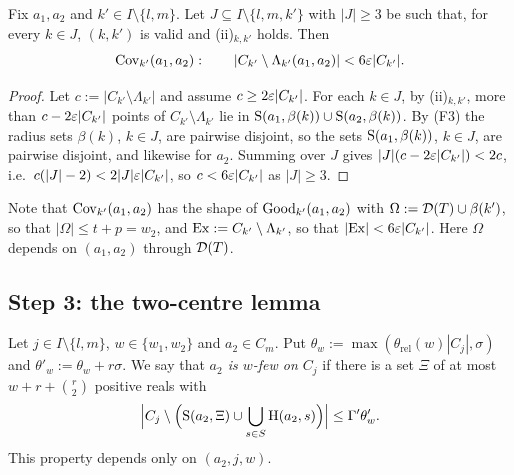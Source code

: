 \begin{lemma}[Step 2]\label{lem:step2}
Fix $a_1,a_2$ and $k'\in I\setminus\{l,m\}$. Let $J\subseteq I\setminus\{l,m,k'\}$ with $|J|\ge3$ be such that, for every
$k\in J$, $(k,k')$ is valid and (ii)$_{k,k'}$ holds. Then
\[
\mathrm{Cov}_{k'}(a_1,a_2):\qquad |C_{k'}\setminus\Lambda_{k'}(a_1,a_2)|<6\varepsilon|C_{k'}| .
\]
\end{lemma}
\begin{proof}
Let $c:=|C_{k'}\setminus\Lambda_{k'}|$ and assume $c\ge2\varepsilon|C_{k'}|$. For each $k\in J$, by (ii)$_{k,k'}$, more than
$c-2\varepsilon|C_{k'}|$ points of $C_{k'}\setminus\Lambda_{k'}$ lie in $\mathrm{S}(a_1,\beta(k))\cup\mathrm{S}(a_2,\beta(k))$. By (F3) the
radius sets $\beta(k)$, $k\in J$, are pairwise disjoint, so the sets $\mathrm{S}(a_1,\beta(k))$, $k\in J$, are pairwise
disjoint, and likewise for $a_2$. Summing over $J$ gives $|J|(c-2\varepsilon|C_{k'}|)<2c$, i.e.\
$c(|J|-2)<2|J|\varepsilon|C_{k'}|$, so $c<6\varepsilon|C_{k'}|$ as $|J|\ge3$.
\end{proof}

Note that $\mathrm{Cov}_{k'}(a_1,a_2)$ has the shape of $\mathrm{Good}_{k'}(a_1,a_2)$ with $\Omega:=\mathcal{D}(T)\cup\beta(k')$, so that
$|\Omega|\le t+p=w_2$, and $\mathrm{Ex}:=C_{k'}\setminus\Lambda_{k'}$, so that $|\mathrm{Ex}|<6\varepsilon|C_{k'}|$. Here $\Omega$ depends on $(a_1,a_2)$
through $\mathcal{D}(T)$.

\subsection{Step 3: the two-centre lemma}

\begin{definition}[$w$-few]\label{def:wfew}
Let $j\in I\setminus\{l,m\}$, $w\in\{w_1,w_2\}$ and $a_2\in C_m$. Put $\theta_w:=\max(\theta_{\mathrm{rel}}(w)|C_j|,\sigma)$ and
$\theta'_w:=\theta_w+r\sigma$. We say that \emph{$a_2$ is $w$-few on $C_j$} if there is a set $\Xi$ of at most
$w+r+\binom r2$ positive reals with
\[
\Bigl|C_j\setminus\Bigl(\mathrm{S}(a_2,\Xi)\cup\bigcup_{s\in S}\mathrm{H}(a_2,s)\Bigr)\Bigr|\le\Gamma'\theta'_w .
\]
This property depends only on $(a_2,j,w)$.
\end{definition}

